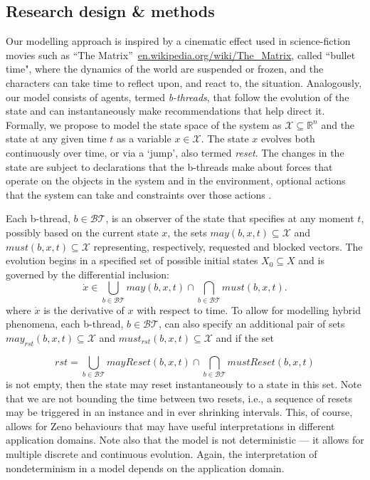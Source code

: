 \documentclass[11pt]{article}
\begin{document}
\subsection{Research design \& methods}
Our modelling approach is inspired by a cinematic effect used in science-fiction movies such as ``The Matrix''~\url{en.wikipedia.org/wiki/The_Matrix}, called ``bullet time", where the dynamics of the world are suspended or frozen, and the characters can take time to reflect upon, and react to, the situation. Analogously, our model consists of agents, termed \emph{b-threads}, that follow the evolution of the state and can instantaneously make recommendations that help direct it. Formally, we propose to model the state space of the system as  $\mathcal{X} \subseteq \mathbb{R}^n$ and the state at any given time $t$ as a variable $x \in \mathcal{X}$. The state $x$ evolves both continuously over time, or via a `jump', also termed \emph{reset}. The changes in the state are subject to 
declarations that  the b-threads make about forces that operate on the objects in the system and in the environment, optional actions that  the system can take and constraints over those actions . 

Each  b-thread, $b \in \mathcal{BT}$, is an observer of the state that specifies at any moment $t$, possibly based on the current state $x$, the sets $may(b,x,t) \subseteq \mathcal{X}$ and $must(b,x,t) \subseteq \mathcal{X}$  representing, respectively,  requested and blocked vectors. The evolution begins in a specified set of possible initial states $X_0 \subseteq X$ and is governed  by the differential inclusion:
\begin{equation}
\dot{x} \in \bigcup_{b \in \mathcal{BT}} may(b,x,t) \cap  \bigcap_{b \in \mathcal{BT}} must(b,x,t). 
\label{eq:diffeqn}
\end{equation}
where $\dot{x}$ is the derivative of $x$ with respect to time. To allow for modelling hybrid phenomena, each b-thread,  $b \in \mathcal{BT}$, can also specify an additional pair of sets  $may_{rst}(b,x,t) \subseteq \mathcal{X}$ and $must_{rst}(b,x,t) \subseteq \mathcal{X}$  and if the set 

$$rst=\bigcup_{b \in \mathcal{BT}} mayReset(b,x,t) \cap   \bigcap_{b \in \mathcal{BT}} mustReset(b,x,t) $$is not empty, then the state may reset instantaneously to a state in this set. Note that we are not bounding the time between two resets, i.e., a sequence of resets may be triggered in an instance and in ever shrinking intervals. This, of course, allows for Zeno behaviours that may have useful interpretations in different application domains. Note also that the model is not deterministic --- it allows for multiple discrete and continuous evolution. Again, the interpretation of nondeterminism in a model depends on the application domain. 
\end{document}
